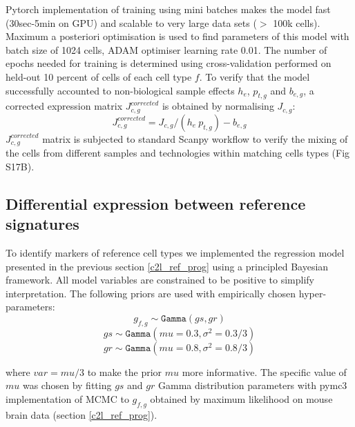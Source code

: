 \documentclass[11pt,a4paper]{article}
\begin{document}
\begin{enumerate}
    Pytorch implementation of training using mini batches makes the model fast (30sec-5min on GPU) and scalable to very large data sets ($>$ 100k cells). Maximum a posteriori optimisation is used to find parameters of this model with batch size of 1024 cells, ADAM optimiser learning rate 0.01. The number of epochs needed for training is determined using cross-validation performed on held-out 10 percent of cells of each cell type $f$. \newline
    To verify that the model successfully accounted to non-biological sample effects $h_e$, $p_{t,g}$ and $b_{e,g}$, a corrected expression matrix $J^{corrected}_{c,g}$ is obtained by normalising $J_{c,g}$:
    \begin{equation} \label{eq:c2l_ref_prog:3}
    J^{corrected}_{c,g} = J_{c,g} / ({h_e} \: p_{t,g}) - b_{e,g}
    \end{equation}
    $J^{corrected}_{c,g}$ matrix is subjected to standard Scanpy workflow \autocite{wolf_scanpy_2018} to verify the mixing of the cells from different samples and technologies within matching cells types (Fig S17B).

\end{enumerate}

\subsection{Differential expression between reference signatures} \label{c2l_ref_prog_diff_expression}

To identify markers of reference cell types we implemented the regression model presented in the previous section \ref{c2l_ref_prog} using a principled Bayesian framework. All model variables are constrained to be positive to simplify interpretation. The following priors are used with empirically chosen hyper-parameters:
\begin{equation} \label{eq:c2l_ref_prog_diff:3}
g_{f,g} \sim \mathtt{Gamma}(gs, gr)
\end{equation}
\begin{equation} \label{eq:c2l_ref_prog_diff:4}
gs \sim \mathtt{Gamma}(mu=0.3, \sigma^2=0.3/3)
\end{equation}
\begin{equation} \label{eq:c2l_ref_prog_diff:4}
gr \sim \mathtt{Gamma}(mu=0.8, \sigma^2=0.8/3)
\end{equation}

where $var = mu / 3$ to make the prior $mu$ more informative. The specific value of $mu$ was chosen by fitting $gs$ and $gr$ Gamma distribution parameters with pymc3 implementation of MCMC to $g_{f,g}$ obtained by maximum likelihood on mouse brain data (section \ref{c2l_ref_prog}).
\end{document}
